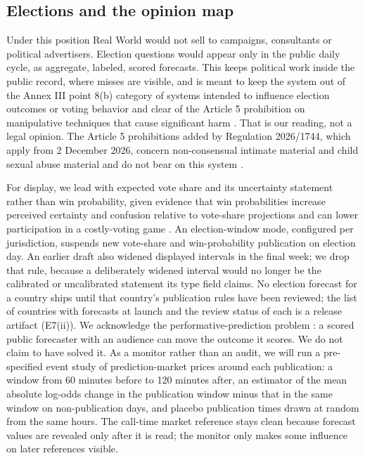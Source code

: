 \documentclass[11pt]{article}
\begin{document}
\subsection{Elections and the opinion map}

Under this position Real World would not sell to campaigns, consultants or political advertisers. Election questions would appear only in the public daily cycle, as aggregate, labeled, scored forecasts. This keeps political work inside the public record, where misses are visible, and is meant to keep the system out of the Annex III point 8(b) category of systems intended to influence election outcomes or voting behavior and clear of the Article 5 prohibition on manipulative techniques that cause significant harm \citep{euaiact2024}. That is our reading, not a legal opinion. The Article 5 prohibitions added by Regulation 2026/1744, which apply from 2 December 2026, concern non-consensual intimate material and child sexual abuse material and do not bear on this system \citep{euomnibus2026}.

For display, we lead with expected vote share and its uncertainty statement rather than win probability, given evidence that win probabilities increase perceived certainty and confusion relative to vote-share projections and can lower participation in a costly-voting game \citep{westwood2020projecting}. An election-window mode, configured per jurisdiction, suspends new vote-share and win-probability publication on election day. An earlier draft also widened displayed intervals in the final week; we drop that rule, because a deliberately widened interval would no longer be the calibrated or uncalibrated statement its type field claims. No election forecast for a country ships until that country's publication rules have been reviewed; the list of countries with forecasts at launch and the review status of each is a release artifact (E7(ii)). We acknowledge the performative-prediction problem \citep{perdomo2020performative,simon1954bandwagon}: a scored public forecaster with an audience can move the outcome it scores. We do not claim to have solved it. As a monitor rather than an audit, we will run a pre-specified event study of prediction-market prices around each publication: a window from 60 minutes before to 120 minutes after, an estimator of the mean absolute log-odds change in the publication window minus that in the same window on non-publication days, and placebo publication times drawn at random from the same hours. The call-time market reference stays clean because forecast values are revealed only after it is read; the monitor only makes some influence on later references visible.
\end{document}
